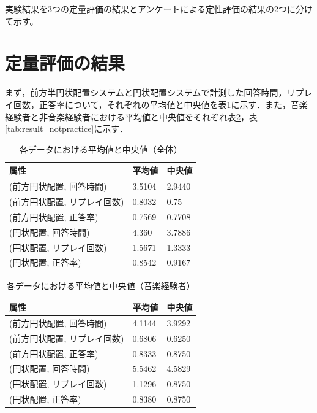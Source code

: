 実験結果を3つの定量評価の結果とアンケートによる定性評価の結果の2つに分けて示す。

\section{定量評価の結果}
まず，前方半円状配置システムと円状配置システムで計測した回答時間，リプレイ回数，正答率について，それぞれの平均値と中央値を表\ref{tab:result_all}に示す．また，音楽経験者と非音楽経験者における平均値と中央値をそれぞれ表\ref{tab:result_practice}，表\ref{tab:result_notpractice}に示す．

\begin{table}[H]\centering 
    \caption{各データにおける平均値と中央値（全体）}\label{tab:result_all}
    \begin{tabular}{lll} \hline
    属性 & 平均値 & 中央値\\ \hline
    (前方円状配置, 回答時間) & 3.5104 & 2.9440\\
    (前方円状配置, リプレイ回数) & 0.8032 & 0.75 \\
    (前方円状配置, 正答率) & 0.7569 & 0.7708\\ \hline
    (円状配置, 回答時間) & 4.360 & 3.7886\\
    (円状配置, リプレイ回数) & 1.5671 & 1.3333\\
    (円状配置, 正答率) & 0.8542 & 0.9167\\ \hline
    \end{tabular}
\end{table}


\begin{table}[H]\centering 
    \caption{各データにおける平均値と中央値（音楽経験者）}\label{tab:result_practice}
    \begin{tabular}{lll} \hline
    属性 & 平均値 & 中央値\\ \hline
    (前方円状配置, 回答時間) & 4.1144 & 3.9292\\
    (前方円状配置, リプレイ回数) & 0.6806 & 0.6250 \\
    (前方円状配置, 正答率) & 0.8333 & 0.8750\\ \hline
    (円状配置, 回答時間) & 5.5462 & 4.5829\\
    (円状配置, リプレイ回数) & 1.1296 & 0.8750\\
    (円状配置, 正答率) & 0.8380 & 0.8750\\ \hline
    \end{tabular}
\end{table}

